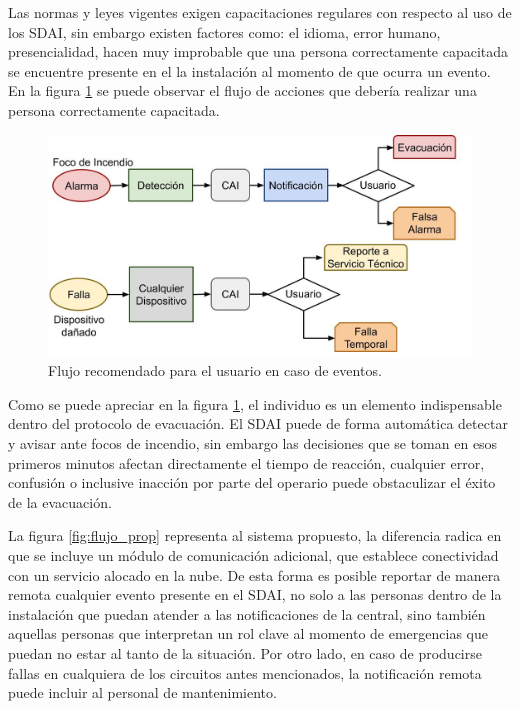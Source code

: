 Las normas y leyes vigentes exigen capacitaciones regulares con respecto al uso de los SDAI, sin embargo existen factores como: el idioma, error humano, presencialidad, hacen muy improbable que una persona correctamente capacitada se encuentre presente en el la instalación al momento de que ocurra un evento. En la figura \ref{fig:flujo_conv_user} se puede observar el flujo de acciones que debería realizar una persona correctamente capacitada.

\begin{figure}[ht]
	\centering
	\includegraphics[scale=.3]{./Figures/flujo_dec.jpg}
	\caption{Flujo recomendado para el usuario en caso de eventos.}
	\label{fig:flujo_conv_user}
\end{figure}

Como se puede apreciar en la figura \ref{fig:flujo_conv_user}, el individuo es un elemento indispensable dentro del protocolo de evacuación. El SDAI puede de forma automática detectar y avisar ante focos de incendio, sin embargo las decisiones que se toman en esos primeros minutos afectan directamente el tiempo de reacción, cualquier error, confusión o inclusive inacción por parte del operario puede obstaculizar el éxito de la evacuación\citep{plan_evac}.

La figura \ref{fig:flujo_prop} representa al sistema propuesto, la diferencia radica en que se incluye un módulo de comunicación adicional, que establece conectividad con un servicio alocado en la nube. De esta forma es posible reportar de manera remota cualquier evento presente en el SDAI, no solo a las personas dentro de la instalación que puedan atender a las notificaciones de la central, sino también aquellas personas que interpretan un rol clave al momento de emergencias que puedan no estar al tanto de la situación. Por otro lado, en caso de producirse fallas en cualquiera de los circuitos antes mencionados, la notificación remota puede incluir al personal de mantenimiento.  

